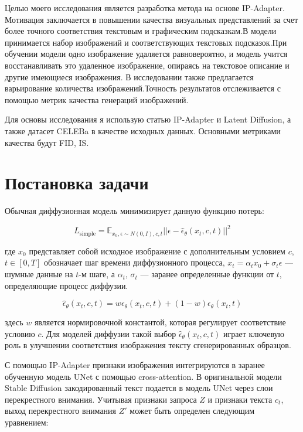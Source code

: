 \documentclass{article}
\begin{document}
Целью моего исследования является разработка метода на основе IP-Adapter. Мотивация заключается в повышении качества визуальных представлений за счет более точного соответствия текстовым и графическим подсказкам.В модели принимается набор изображений и соответствующих текстовых подсказок.При обучении модели одно изображение удаляется равновероятно, и модель учится восстанавливать это удаленное изображение, опираясь на текстовое описание и другие имеющиеся изображения. В исследовании также предлагается варьирование количества изображений.Точность результатов отслеживается с помощью метрик качества генераций изображений.

Для основы исследования я использую статью IP-Adapter и Latent Diffusion, а также датасет CELEBa в качестве исходных данных.
Основными метриками качества будут FID, IS.

\section{Постановка задачи}

Обычная диффузионная модель минимизирует данную функцию потерь:

\begin{equation}
L_{\text{simple}} = \mathbb{E}_{x_0, \epsilon \sim N(0, I), c, t} ||\epsilon - \hat{\epsilon}_{\theta}(x_t, c, t) ||^2 
\end{equation}

где \(x_0\) представляет собой исходное изображение с дополнительным условием \(c\), \(t \in [0, T]\) обозначает шаг времени диффузионного процесса, \(x_t = \alpha_t x_0 + \sigma_t \epsilon\) --- шумные данные на \(t\)-м шаге, а \(\alpha_t\), \(\sigma_t\) --- заранее определенные функции от \(t\), определяющие процесс диффузии.

\begin{equation}
\hat{\epsilon}_{\theta}(x_t, c, t) = w\epsilon_{\theta}(x_t, c, t) + (1 - w)\epsilon_{\theta}(x_t, t)
\end{equation}

здесь \(w\) является нормировочной константой, которая регулирует соответствие условию \(c\). Для моделей диффузии такой выбор \(\hat{\epsilon}_{\theta}(x_t, c, t)\) играет ключевую роль в улучшении соответствия изображения тексту сгенерированных образцов.

С помощью IP-Adapter признаки изображения интегрируются в заранее обученную модель UNet с помощью cross-attention. В оригинальной модели Stable Diffusion закодированный текст подается в модель UNet через слои перекрестного внимания. Учитывая признаки запроса \(Z\) и признаки текста \(c_t\), выход перекрестного внимания \(Z'\) может быть определен следующим уравнением:
\end{document}
